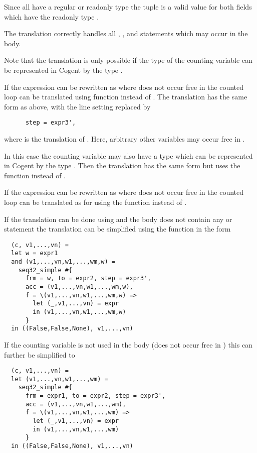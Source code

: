 Since all  have a regular or readonly type the tuple  is a valid value for 
both  fields which have the readonly type .

The translation correctly handles all , , and  statements which may occur 
in the body. 

Note that the translation is only possible if the type of the counting variable  can be represented in 
Cogent by the type .

If the expression  can be rewritten as  where  does not occur free in 
the counted loop can be translated using 
function  instead of . The translation has the same form as above, with the line 
setting  replaced by
\begin{verbatim}
      step = expr3', 
\end{verbatim}
where  is the translation of . Here, arbitrary other variables may occur free in .

In this case the counting variable  may also have a type which can be represented in Cogent by the type .
Then the translation has the same form but uses the function  instead of .

If the expression  can be rewritten as  where  does not occur free in 
the counted loop can be translated as for  using the function  instead of .

If the translation can be done using  and the body does not contain any  or  statement 
the translation can be simplified using the function  in the form
\begin{verbatim}
  (c, v1,...,vn) = 
  let w = expr1
  and (v1,...,vn,w1,...,wm,w) = 
    seq32_simple #{
      frm = w, to = expr2, step = expr3', 
      acc = (v1,...,vn,w1,...,wm,w), 
      f = \(v1,...,vn,w1,...,wm,w) => 
        let (_,v1,...,vn) = expr
        in (v1,...,vn,w1,...,wm,w)
      }
  in ((False,False,None), v1,...,vn)
\end{verbatim}
If the counting variable  is not used in the body (does not occur free in ) this can further be simplified to
\begin{verbatim}
  (c, v1,...,vn) = 
  let (v1,...,vn,w1,...,wm) = 
    seq32_simple #{
      frm = expr1, to = expr2, step = expr3', 
      acc = (v1,...,vn,w1,...,wm), 
      f = \(v1,...,vn,w1,...,wm) => 
        let (_,v1,...,vn) = expr
        in (v1,...,vn,w1,...,wm)
      }
  in ((False,False,None), v1,...,vn)
\end{verbatim}

